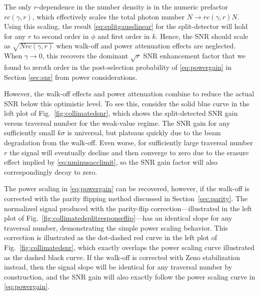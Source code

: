 The only $r$-dependence in the number density is in the numeric prefactor $r c(\gamma,r)$, which effectively scales the total photon number $N \to r c(\gamma,r) N$.  Using this scaling, the result \eqref{eq:splitgausslinear} for the split-detector will hold for any $r$ to second order in $\phi$ and first order in $k$.  Hence, the SNR should scale as $\sqrt{N r c(\gamma, r)}$ when walk-off and power attenuation effects are neglected.  When $\gamma \to 0$, this recovers the dominant $\sqrt{r}$ SNR enhancement factor that we found to zeroth order in the post-selection probability of \eqref{eq:powergain} in Section \ref{sec:snr} from power considerations.

However, the walk-off effects and power attenuation combine to reduce the actual SNR below this optimistic level.  To see this, consider the solid blue curve in the left plot of Fig.~\ref{fig:collimatedsnr}, which shows the split-detected SNR gain versus traversal number for the weak-value regime.  The SNR gain for any sufficiently small $k\sigma$ is universal, but plateaus quickly due to the beam degradation from the walk-off.  Even worse, for sufficiently large traversal number $r$ the signal will eventually decline and then converge to zero due to the erasure effect implied by \eqref{eq:nminusacclimit}, so the SNR gain factor will also correspondingly decay to zero.  

The power scaling in \eqref{eq:powergain} can be recovered, however, if the walk-off is corrected with the parity flipping method discussed in Section~\ref{sec:parity}.  The normalized signal produced with the parity-flip correction---illustrated in the left plot of Fig.~\ref{fig:collimatedsplitresponseflip}---has an identical slope for any traversal number, demonstrating the simple power scaling behavior.  This correction is illustrated as the dot-dashed red curve  in the left plot of Fig.~\ref{fig:collimatedsnr}, which exactly overlaps the power scaling curve illustrated as the dashed black curve.  If the walk-off is corrected with Zeno stabilization instead, then the signal slope will be identical for any traversal number by construction, and the SNR gain will also exactly follow the power scaling curve in \eqref{eq:powergain}.


